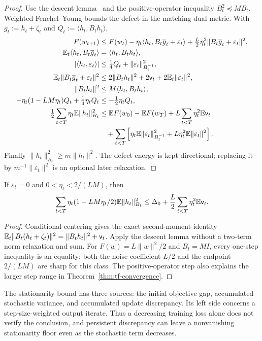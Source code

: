 \begin{proof}
Use the descent lemma~\citep{nesterov2004introductory} and the positive-operator
inequality $B_t^2\preceq MB_t$. Weighted Fenchel--Young bounds the defect
in the matching dual metric. With $\overline g_t:=h_t+\zeta_t$ and
$Q_t:=\langle h_t,B_th_t\rangle$,
\begin{align}
 F(w_{t+1})&\le F(w_t)-\eta_t\langle h_t,B_t\overline g_t+\varepsilon_t\rangle
                    +\tfrac L2\eta_t^2\|B_t\overline g_t+\varepsilon_t\|^2,\\
 \mathbb E_t\langle h_t,B_t\overline g_t\rangle
 &=\langle h_t,B_th_t\rangle,\\
 |\langle h_t,\varepsilon_t\rangle|
 &\le\tfrac14 Q_t+\|\varepsilon_t\|_{B_t^{-1}}^2,\\
 \mathbb E_t\|B_t\overline g_t+\varepsilon_t\|^2
 &\le2\|B_th_t\|^2+2\mathsf v_t+2\mathbb E_t\|\varepsilon_t\|^2,\\
 \|B_th_t\|^2&\le M\langle h_t,B_th_t\rangle,\\
 -\eta_t(1-LM\eta_t)Q_t
                 +\tfrac14\eta_t Q_t
 &\le-\tfrac12\eta_t Q_t,\\
 \tfrac12\sum_{t<T}\eta_t\mathbb E\|h_t\|_{B_t}^2
 &\le\mathbb E F(w_0)-\mathbb E F(w_T)
 +L\sum_{t<T}\eta_t^2\mathbb E\mathsf v_t\\
 &\quad+\sum_{t<T}\left[\eta_t\mathbb E\|\varepsilon_t\|_{B_t^{-1}}^2
                              +L\eta_t^2\mathbb E\|\varepsilon_t\|^2\right].
\end{align}
Finally $\|h_t\|_{B_t}^2\ge m\|h_t\|^2$. The defect energy is kept directional;
replacing it by $m^{-1}\|\varepsilon_t\|^2$ is an optional later relaxation.
\end{proof}
\begin{corollary}\label{cor:sharp-descent}
If $\varepsilon_t=0$ and $0<\eta_t<2/(LM)$, then
\begin{equation}
 \sum_{t<T}\eta_t(1-LM\eta_t/2)\mathbb E\|h_t\|_{B_t}^2
 \le\Delta_0+\frac L2\sum_{t<T}\eta_t^2\mathbb E\mathsf v_t.
\end{equation}
\end{corollary}
\begin{proof}
Conditional centering gives the exact second-moment identity
$\mathbb E_t\|B_t(h_t+\zeta_t)\|^2=\|B_th_t\|^2+\mathsf v_t$.
Apply the descent lemma without a two-term norm relaxation and sum.
For $F(w)=L\|w\|^2/2$ and $B_t=MI$, every one-step inequality is an equality:
both the noise coefficient $L/2$ and the endpoint $2/(LM)$ are sharp for this
class. The positive-operator step also explains the larger step range in
Theorem~\ref{thm:tf-convergence}.
\end{proof}
The stationarity bound has three sources: the initial objective gap, accumulated
stochastic variance, and accumulated update discrepancy. Its left side concerns
a step-size-weighted output iterate. Thus a decreasing training loss alone
does not verify the conclusion, and persistent discrepancy can leave a
nonvanishing stationarity floor even as the stochastic term decreases.

